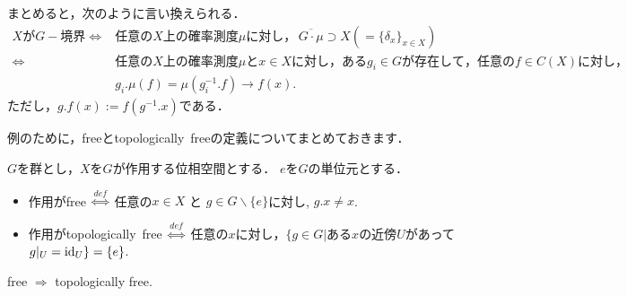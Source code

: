 \documentclass{jsarticle}[12pt]
\begin{document}
\begin{remark}
  まとめると，次のように言い換えられる．
  \begin{align*}
    XがG-境界 \Leftrightarrow& 任意のX上の確率測度\mu に対し，\, \overline{G \cdot \mu} \supset X(= \{\delta_x\}_{x \in X})\\
    \Leftrightarrow& 任意のX上の確率測度\mu とx \in X に対し，ある g_i \in Gが存在して，任意の f \in C(X)に対し，\\
    &g_i.\mu(f) = \mu(g_i^{-1}.f) \rightarrow f(x).
  \end{align*}
  ただし，$g.f(x) := f(g^{-1}.x)$である．
\end{remark}
例のために，freeとtopologically\, freeの定義についてまとめておきます．
\begin{definition}
  $G$を群とし，$X$を$G$が作用する位相空間とする．
  $e$を$G$の単位元とする．
  \begin{itemize}
  \item 作用がfree $\overset{def}{\Leftrightarrow}$ 任意の$ x \in X$ と $g \in G\backslash \{e\}$に対し, $g.x \neq x$.
  \item 作用がtopologically\, free $\overset{def}{\Leftrightarrow}$ 任意の$x$に対し，$\{g \in G |$ある$x$の近傍$U$があって $g|_U = {\rm id}_U\} = \{e\}$.
  \end{itemize}
\end{definition}
\begin{remark}
  free $\Rightarrow$ topologically free.
\end{remark}
\end{document}
